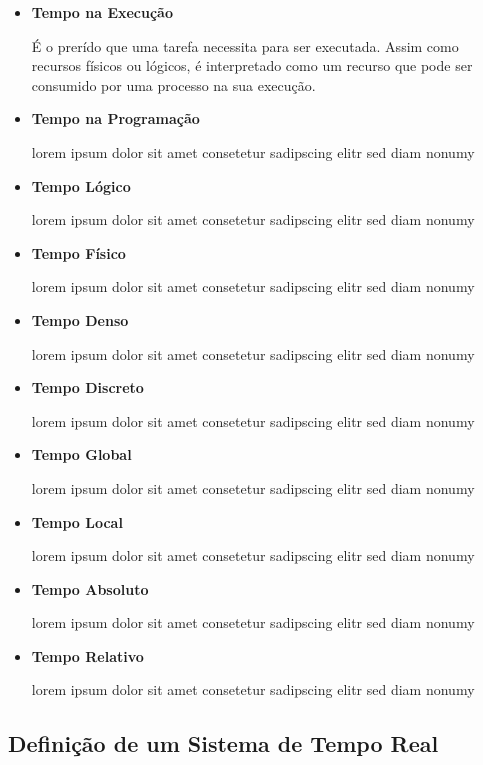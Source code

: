 \begin{itemize}
\item \textbf{Tempo na Execução}

É o prerído que uma tarefa necessita para ser executada. Assim como recursos
físicos ou lógicos, é interpretado como um recurso que pode ser consumido
por uma processo na sua execução.

\item \textbf{Tempo na Programação}

lorem ipsum dolor sit amet consetetur sadipscing elitr sed diam nonumy

\item \textbf{Tempo Lógico}

lorem ipsum dolor sit amet consetetur sadipscing elitr sed diam nonumy

\item \textbf{Tempo Físico}

lorem ipsum dolor sit amet consetetur sadipscing elitr sed diam nonumy

\item \textbf{Tempo Denso}

lorem ipsum dolor sit amet consetetur sadipscing elitr sed diam nonumy

\item \textbf{Tempo Discreto}

lorem ipsum dolor sit amet consetetur sadipscing elitr sed diam nonumy

\item \textbf{Tempo Global}

lorem ipsum dolor sit amet consetetur sadipscing elitr sed diam nonumy

\item \textbf{Tempo Local}

lorem ipsum dolor sit amet consetetur sadipscing elitr sed diam nonumy

\item \textbf{Tempo Absoluto}

lorem ipsum dolor sit amet consetetur sadipscing elitr sed diam nonumy

\item \textbf{Tempo Relativo}

lorem ipsum dolor sit amet consetetur sadipscing elitr sed diam nonumy

\end{itemize}

\subsection{Definição de um Sistema de Tempo Real}
